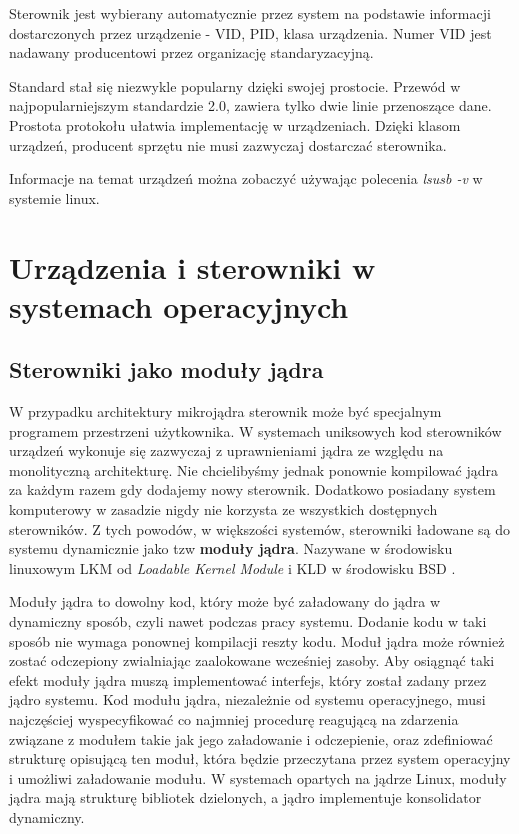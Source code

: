 \documentclass[shortabstract,inz]{iithesis}
\begin{document}
Sterownik jest
wybierany automatycznie przez system na podstawie informacji dostarczonych przez
urządzenie - VID, PID, klasa urządzenia. Numer VID jest nadawany producentowi
przez organizację standaryzacyjną. 

Standard stał się niezwykle popularny dzięki swojej prostocie. Przewód w najpopularniejszym 
standardzie 2.0, zawiera tylko dwie linie
przenoszące dane. Prostota protokołu ułatwia implementację w urządzeniach.
Dzięki klasom urządzeń, producent sprzętu nie musi zazwyczaj dostarczać
sterownika.

Informacje na temat urządzeń można zobaczyć używając polecenia \textit{lsusb -v} w systemie linux.


\chapter{Urządzenia i sterowniki w systemach operacyjnych}

\section{Sterowniki jako moduły jądra} %

W przypadku architektury mikrojądra sterownik może być specjalnym programem przestrzeni
użytkownika. W systemach uniksowych kod sterowników urządzeń wykonuje się zazwyczaj 
z uprawnieniami jądra ze względu na monolityczną architekturę.
Nie chcielibyśmy jednak ponownie kompilować
jądra za każdym razem gdy dodajemy nowy sterownik. Dodatkowo
posiadany system komputerowy w zasadzie nigdy nie korzysta ze
wszystkich dostępnych sterowników.
Z tych powodów, w większości systemów, sterowniki ładowane są do systemu
dynamicznie jako tzw \textbf{moduły jądra}.  Nazywane w środowisku
linuxowym LKM od \textit{Loadable Kernel Module} i KLD w środowisku
BSD \cite{wiki:lkm}.

Moduły jądra to dowolny kod, który może być załadowany do jądra w
dynamiczny sposób, czyli nawet podczas pracy systemu. Dodanie kodu w taki sposób
nie wymaga ponownej kompilacji reszty kodu.
Moduł jądra może również zostać odczepiony zwialniając zaalokowane wcześniej zasoby. 
Aby osiągnąć taki efekt
moduły jądra muszą implementować interfejs, który został zadany przez
jądro systemu. Kod modułu jądra, niezależnie od systemu operacyjnego,
musi najczęściej wyspecyfikować co najmniej procedurę reagującą na
zdarzenia związane z modułem takie jak jego załadowanie i
odczepienie, oraz zdefiniować strukturę opisującą ten moduł, która
będzie przeczytana przez system operacyjny i umożliwi załadowanie
modułu. W systemach opartych na jądrze Linux, moduły jądra mają strukturę 
bibliotek dzielonych, a jądro implementuje konsolidator dynamiczny.
\end{document}
